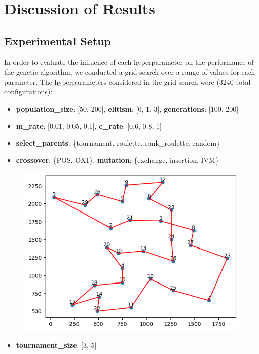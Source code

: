 \documentclass[11pt]{article}
\begin{document}
\section{Discussion of Results}
\subsection{Experimental Setup}
In order to evaluate the influence of each hyperparameter on the performance of the genetic algorithm, we conducted a grid search over a range of values for each parameter. The hyperparameters considered in the grid search were (3240 total configurations):
\begin{itemize}
    \item \textbf{population\_size}: [50, 200], \textbf{elitism}: [0, 1, 3], \textbf{generations}: [100, 200]
    \item \textbf{m\_rate}: [0.01, 0.05, 0.1], \textbf{c\_rate}: [0.6, 0.8, 1]
    \item \textbf{select\_parents}: \{tournament, roulette, rank\_roulette, random\}
    \item \textbf{crossover}: \{POS, OX1\}, \textbf{mutation}: \{exchange, insertion, IVM\}
\end{itemize}

\begin{figure}
    \centering
    \includegraphics[width=\linewidth]{../results/best_chromosme.png}
    \label{fig:best_route}
\end{figure}

\begin{itemize}
    \item \textbf{tournament\_size}: [3, 5]
\end{itemize}
\end{document}
